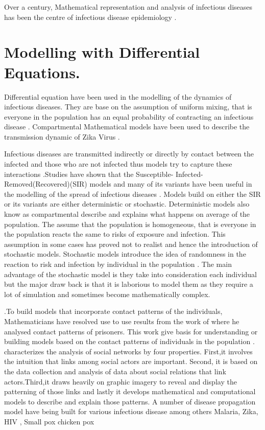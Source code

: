 Over a  century, Mathematical representation and analysis of infectious diseases has been the centre of  infectious disease epidemiology \citep{b2005}. 
\section{Modelling with Differential Equations.}

Differential equation have been used in the modelling of the dynamics of infectious diseases. They are base on the assumption of uniform mixing, that is everyone in the population has an equal probability of contracting an infectious disease \citep{kaplan2002emergency}.
Compartmental Mathematical models have been used to describe the transmission dynamic of Zika Virus \citep{gao2016}.


 Infectious diseases are transmitted indirectly  or directly by contact between the infected and those who are not infected thus models try to capture these interactions \citep{sat}.Studies have shown that the 
 Susceptible- Infected- Removed(Recovered)(SIR) models and many of its variants have been useful in the modelling of the spread of infectious diseases \citep{li}. Models build on either the SIR or its variants are either deterministic or stochastic. Deterministic models also know as compartmental describe and explains what happens on average of the population. The assume that the population is homogeneous, that is everyone in the population reacts the same to risks of exposure and infection. This assumption in some cases has proved not to realist and hence the introduction of stochastic models. Stochastic models introduce the idea of randomness in the reaction to risk and infection by individual in the population \citep{ming2016stochastic}. The main advantage of the stochastic model is they take into consideration each individual but the major draw back is that it is laborious to model them as they require a lot of simulation and sometimes become mathematically complex.


 
 .To build models that incorporate contact patterns of the individuals, Mathematicians have resolved use to use results from the work of \cite{moreno1945application} where he analysed contact patterns of prisoners. This work give basis for understanding or building models based on the contact patterns of individuals in the population \citep{sat}. \cite{freeman2004development} characterizes the analysis of social networks by four properties. First,it involves the intuition
 that links among social actors 
are important. Second, it is based on the data collection and analysis of data about social relations that link actors.Third,it draws heavily on graphic imagery to reveal and display the patterning of those links and lastly it develops mathematical and computational models to describe and explain those patterns. 
 A number of disease propagation model have being built for various infectious disease among others Malaria, Zika, HIV , Small pox chicken pox \citep{ding2016mathematical}

